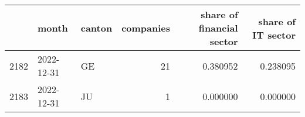 \begin{tabular}{lllrrr}
\toprule
{} &      month & canton &  companies &  share of financial sector &  share of IT sector \\
\midrule
2182 & 2022-12-31 &     GE &         21 &                   0.380952 &            0.238095 \\
2183 & 2022-12-31 &     JU &          1 &                   0.000000 &            0.000000 \\
\bottomrule
\end{tabular}
